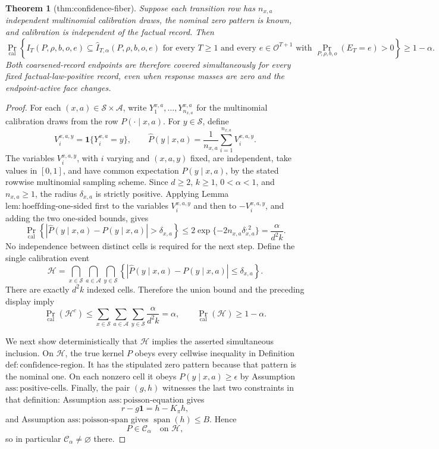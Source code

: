 \documentclass{article}
\newtheorem{theorem}{Theorem}
\begin{document}
\begin{theorem}[thm:confidence-fiber]\label{thm:confidence-fiber}
Suppose each transition row has \(n_{x,a}\) independent multinomial calibration draws, the nominal zero pattern is known, and calibration is independent of the factual record. Then \[\Pr_{\mathrm{cal}}\left\{I_T(P,\rho,b,o,e)\subseteq\widehat I_{T,\alpha}(P,\rho,b,o,e)\text{ for every }T\ge1\text{ and every }e\in\mathcal O^{T+1}\text{ with }\Pr_{P,\rho,b,o}(E_T=e)>0\right\}\ge1-\alpha.\] Both coarsened-record endpoints are therefore covered simultaneously for every fixed factual-law-positive record, even when response masses are zero and the endpoint-active face changes.
\end{theorem}
\begin{proof}
For each \((x,a)\in\mathcal S\times\mathcal A\), write \(Y^{x,a}_1,\ldots,Y^{x,a}_{n_{x,a}}\) for the multinomial calibration draws from the row \(P(\cdot\mid x,a)\).  For \(y\in\mathcal S\), define
\[
 V^{x,a,y}_i=\mathbf 1\{Y^{x,a}_i=y\},
 \qquad
 \widehat P(y\mid x,a)=\frac{1}{n_{x,a}}\sum_{i=1}^{n_{x,a}}V^{x,a,y}_i.
\]
The variables \(V^{x,a,y}_i\), with \(i\) varying and \((x,a,y)\) fixed, are independent, take values in \([0,1]\), and have common expectation \(P(y\mid x,a)\), by the stated rowwise multinomial sampling scheme.  Since \(d\ge2\), \(k\ge1\), \(0<\alpha<1\), and \(n_{x,a}\ge1\), the radius \(\delta_{x,a}\) is strictly positive.  Applying Lemma \(\mathrm{lem:hoeffding\mbox{-}one\mbox{-}sided}\) first to the variables \(V^{x,a,y}_i\) and then to \(-V^{x,a,y}_i\), and adding the two one-sided bounds, gives
\[
 \Pr_{\mathrm{cal}}\!\left\{
 \left|\widehat P(y\mid x,a)-P(y\mid x,a)\right|>\delta_{x,a}
 \right\}
 \le 2\exp\{-2n_{x,a}\delta_{x,a}^{,2}\}
 =\frac{\alpha}{d^2k}.
\]
No independence between distinct cells is required for the next step.  Define the single calibration event
\[
 \mathcal H=
 \bigcap_{x\in\mathcal S}\bigcap_{a\in\mathcal A}\bigcap_{y\in\mathcal S}
 \left\{
 \left|\widehat P(y\mid x,a)-P(y\mid x,a)\right|\le\delta_{x,a}
 \right\}.
\]
There are exactly \(d^2k\) indexed cells.  Therefore the union bound and the preceding display imply
\[
 \Pr_{\mathrm{cal}}(\mathcal H^c)
 \le
 \sum_{x\in\mathcal S}\sum_{a\in\mathcal A}\sum_{y\in\mathcal S}
 \frac{\alpha}{d^2k}
 =\alpha,
 \qquad
 \Pr_{\mathrm{cal}}(\mathcal H)\ge1-\alpha.
\]

We next show deterministically that \(\mathcal H\) implies the asserted simultaneous inclusion.  On \(\mathcal H\), the true kernel \(P\) obeys every cellwise inequality in Definition \(\mathrm{def:confidence\mbox{-}region}\).  It has the stipulated zero pattern because that pattern is the nominal one.  On each nonzero cell it obeys \(P(y\mid x,a)\ge\epsilon\) by Assumption \(\mathrm{ass:positive\mbox{-}cells}\).  Finally, the pair \((g,h)\) witnesses the last two constraints in that definition: Assumption \(\mathrm{ass:poisson\mbox{-}equation}\) gives
\[
 r-g\mathbf 1=h-K_{\pi}h,
\]
and Assumption \(\mathrm{ass:poisson\mbox{-}span}\) gives \(\operatorname{span}(h)\le B\).  Hence
\[
 P\in\mathcal C_{\alpha}
 \quad\text{on }\mathcal H,
\]
so in particular \(\mathcal C_{\alpha}\ne\varnothing\) there.


\end{proof}
\end{document}
